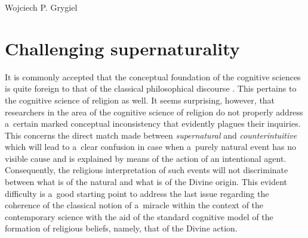 \begin{artengenv}{Wojciech P. Grygiel}
\section*{Challenging supernaturality}
It is commonly accepted that the conceptual foundation of the cognitive sciences is quite foreign to that of the classical philosophical discourse
\parencites[e.g.][]{brozek_philosophy_2013}[][]{grygiel_metodologiczne_2011}. %
 This pertains to the cognitive science of religion as well. It seems surprising, however, that researchers in the area of the cognitive science of religion do not properly address a~certain marked conceptual inconsistency that evidently plagues their inquiries. This concerns the direct match made between \textit{supernatural} and \textit{counterintuitive} 
\parencite[e.g.][p.97]{barrett_cognitive_2011} %
 which will lead to a~clear confusion in case when a~purely natural event has no visible cause and is explained by means of the action of an intentional agent. Consequently, the religious interpretation of such events will not discriminate between what is of the natural and what is of the Divine origin. This evident difficulty is a~good starting point to address the last issue regarding the coherence of the classical notion of a~miracle within the context of the contemporary science with the aid of the standard cognitive model of the formation of religious beliefs, namely, that of the Divine action.


\end{artengenv}
